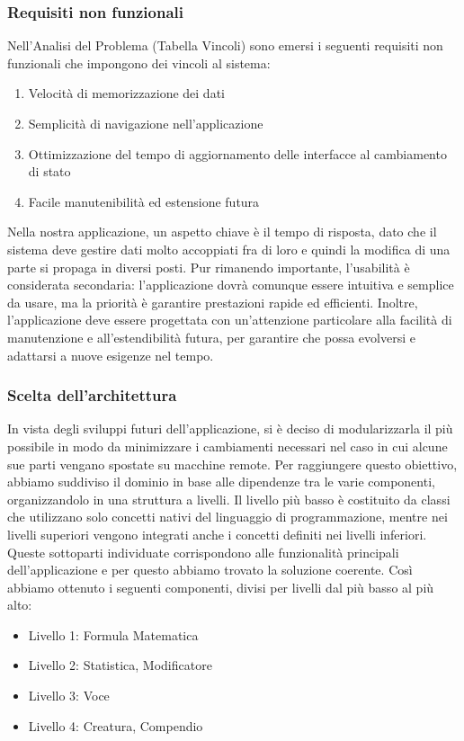 \documentclass[a4paper, 11pt]{article}
\begin{document}
\subsubsection{Requisiti non funzionali}
Nell’Analisi del Problema (Tabella Vincoli) sono emersi i seguenti requisiti non funzionali che impongono dei vincoli al sistema:

\begin{enumerate}[\indent1.]
    \item Velocità di memorizzazione dei dati
    \item Semplicità di navigazione nell’applicazione
    \item Ottimizzazione del tempo di aggiornamento delle interfacce al cambiamento di stato
    \item Facile manutenibilità ed estensione futura
\end{enumerate}

Nella nostra applicazione, un aspetto chiave è il tempo di risposta, dato che il sistema deve gestire dati molto accoppiati fra di loro e quindi la modifica di una parte si propaga in diversi posti. Pur rimanendo importante, l'usabilità è considerata secondaria: l'applicazione dovrà comunque essere intuitiva e semplice da usare, ma la priorità è garantire prestazioni rapide ed efficienti.
Inoltre, l'applicazione deve essere progettata con un'attenzione particolare alla facilità di manutenzione e all'estendibilità futura, per garantire che possa evolversi e adattarsi a nuove esigenze nel tempo.

\subsubsection{Scelta dell'architettura}
In vista degli sviluppi futuri dell’applicazione, si è deciso di modularizzarla il più possibile in modo da minimizzare i cambiamenti necessari nel caso in cui alcune sue parti vengano spostate su macchine remote. Per raggiungere questo obiettivo, abbiamo suddiviso il dominio in base alle dipendenze tra le varie componenti, organizzandolo in una struttura a livelli. Il livello più basso è costituito da classi che utilizzano solo concetti nativi del linguaggio di programmazione, mentre nei livelli superiori vengono integrati anche i concetti definiti nei livelli inferiori. Queste sottoparti individuate corrispondono alle funzionalità principali dell’applicazione e per questo abbiamo trovato la soluzione coerente.
Così abbiamo ottenuto i seguenti componenti, divisi per livelli dal più basso al più alto:
\begin{itemize}
\item Livello 1: Formula Matematica
\item Livello 2: Statistica, Modificatore
\item Livello 3: Voce
\item Livello 4: Creatura, Compendio
\end{itemize}
\end{document}
